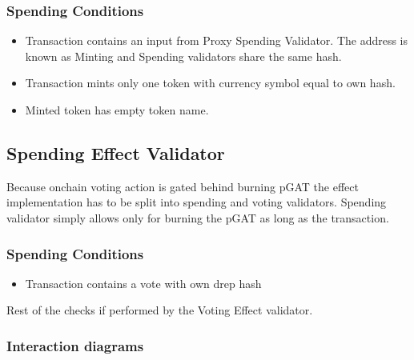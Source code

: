 \documentclass{article}
\begin{document}
\subsubsection*{Spending Conditions}

\begin{itemize}
  \item Transaction contains an input from Proxy Spending Validator. The address is known as Minting and Spending validators share the same hash.
  \item Transaction mints only one token with currency symbol equal to own hash.
  \item Minted token has empty token name.
\end{itemize}

\subsection{Spending Effect Validator}

Because onchain voting action is gated behind burning pGAT the effect implementation has to be split into spending and voting validators. Spending validator simply allows only for burning the pGAT as long as the transaction.

\subsubsection*{Spending Conditions}

\begin{itemize}
  \item Transaction contains a vote with own drep hash
\end{itemize}

Rest  of the checks if performed by the Voting Effect validator.

\subsubsection*{Interaction diagrams}
\end{document}
